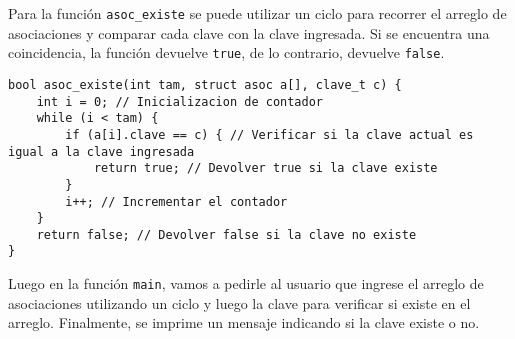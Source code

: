 \documentclass{article}
\begin{document}
Para la función \texttt{asoc\_existe} se puede utilizar un ciclo para recorrer el arreglo de asociaciones y comparar cada clave con la clave ingresada. Si se encuentra una coincidencia, la función devuelve \texttt{true}, de lo contrario, devuelve \texttt{false}.
\begin{verbatim}
bool asoc_existe(int tam, struct asoc a[], clave_t c) {
    int i = 0; // Inicializacion de contador
    while (i < tam) {
        if (a[i].clave == c) { // Verificar si la clave actual es igual a la clave ingresada
            return true; // Devolver true si la clave existe
        }
        i++; // Incrementar el contador
    }
    return false; // Devolver false si la clave no existe
}
\end{verbatim}

Luego en la función \texttt{main}, vamos a pedirle al usuario que ingrese el arreglo de asociaciones utilizando un ciclo y luego la clave para verificar si existe en el arreglo. Finalmente, se imprime un mensaje indicando si la clave existe o no.
\end{document}
